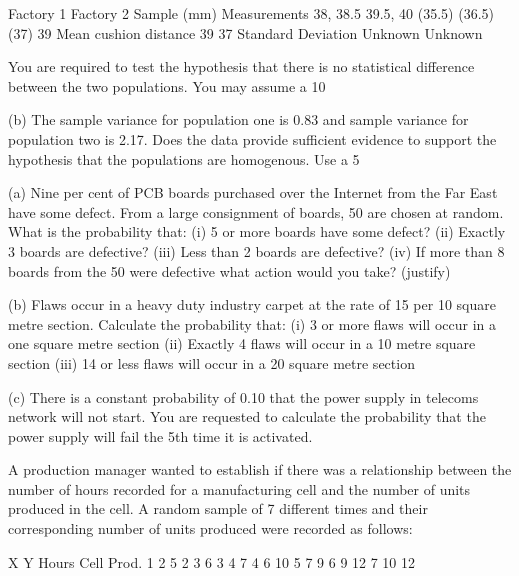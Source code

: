 	Factory 1	Factory 2
Sample (mm) Measurements	38,     38.5
39.5,  40	(35.5)  (36.5)
(37)     39
Mean cushion distance	39	37
Standard Deviation	Unknown	Unknown

You are required to test the hypothesis that there is no statistical difference between the two populations.  You may assume a 10%

(b) 	The sample variance for population one is 0.83 and sample variance for population two is 2.17.  Does the data provide sufficient evidence to support the hypothesis that the populations are homogenous.  Use a 5%



(a)  	Nine per cent of PCB boards purchased over the Internet from the Far East have some defect.  From a large consignment of boards, 50 are chosen at random.  What is the probability that:
(i)	5 or more boards have some defect?
(ii)	Exactly 3 boards are defective?
(iii)	Less than 2 boards are defective?
(iv)	If more than 8 boards from the 50 were defective what action would you take? (justify)


(b) 	Flaws occur in a heavy duty industry carpet at the rate of 15 per 10 square metre section.  Calculate the probability that:
(i)	3 or more flaws will occur in a one square metre section
(ii)	Exactly 4 flaws will occur in a 10 metre square section
(iii)	14 or less flaws will occur in a 20 square metre section

(c)	There is a constant probability of 0.10 that the power supply in telecoms network will not start.  You are requested to calculate the probability that the power supply will fail the 5th time it is activated.


A production manager wanted to establish if there was a relationship between the number of hours recorded for a manufacturing cell and the number of units produced in the cell.  A random sample of 7 different times and their corresponding number of units produced were recorded as follows:


	X	Y
	Hours	Cell Prod.
1	2	5
2	3	6
3	4	7
4	6	10
5	7	9
6	9	12
7	10	12
	
